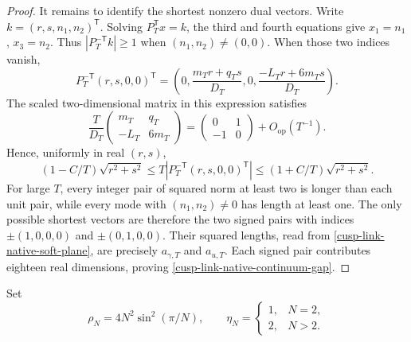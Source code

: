 \documentclass[11pt]{article}
\theoremstyle{definition}
\numberwithin{equation}{section}
\begin{document}
\begin{proof}
It remains to identify the shortest nonzero dual vectors.  Write
\(k=(r,s,n_1,n_2)^{\mathsf T}\).  Solving \(P_T^{\mathsf T}x=k\), the third
and fourth equations give \(x_1=n_1\), \(x_3=n_2\).  Thus
\(|P_T^{-\mathsf T}k|\ge1\) when \((n_1,n_2)\ne(0,0)\).  When those two
indices vanish,
\begin{equation}
 P_T^{-\mathsf T}(r,s,0,0)^{\mathsf T}
 =\left(0,\frac{m_Tr+q_Ts}{D_T},0,
           \frac{-L_Tr+6m_Ts}{D_T}\right).
 \label{cusp-link-native-soft-plane}
\end{equation}
The scaled two-dimensional matrix in this expression satisfies
\[
 \frac{T}{D_T}
 \begin{pmatrix}m_T&q_T\\-L_T&6m_T\end{pmatrix}
 =\begin{pmatrix}0&1\\-1&0\end{pmatrix}+O_{\mathrm{op}}(T^{-1}).
\]
Hence, uniformly in real \((r,s)\),
\[
 (1-C/T)\sqrt{r^2+s^2}
 \le T|P_T^{-\mathsf T}(r,s,0,0)^{\mathsf T}|
 \le(1+C/T)\sqrt{r^2+s^2}.
\]
For large \(T\), every integer pair of squared norm at least two is longer
than each unit pair, while every mode with \((n_1,n_2)\ne0\) has length at
least one.  The only possible shortest vectors are therefore the two signed
pairs with indices \(\pm(1,0,0,0)\) and \(\pm(0,1,0,0)\).  Their squared
lengths, read from \eqref{cusp-link-native-soft-plane}, are precisely
\(a_{\gamma,T}\) and \(a_{u,T}\).  Each signed pair contributes eighteen
real dimensions, proving \eqref{cusp-link-native-continuum-gap}.
\end{proof}

Set
\begin{equation}
 \rho_N=4N^2\sin^2(\pi/N),\qquad
 \eta_N=\begin{cases}1,&N=2,\\2,&N>2.\end{cases}
 \label{cusp-link-native-rho-eta}
\end{equation}
\end{document}
